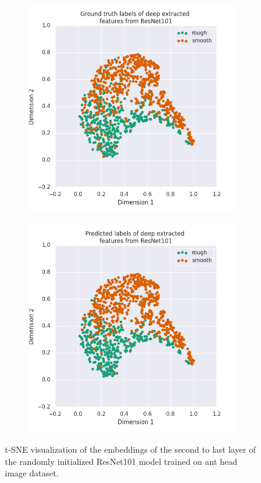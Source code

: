 \documentclass[12pt]{article}
\begin{document}
\begin{figure}[h]
    \centering
    \begin{subfigure}{.45\textwidth}
        \includegraphics[width=1\linewidth]{assets/plots/resnet101_gt_tsne.png}
    \end{subfigure}
    \begin{subfigure}{.45\textwidth}
        \includegraphics[width=1\linewidth]{assets/plots/resnet101_pred_tsne.png}
    \end{subfigure}
    \caption{t-SNE visualization of the embeddings of the second to last layer
        of the randomly initialized ResNet101 model trained on ant head image
        dataset.}
    \label{fig:resnet101_tsne}
\end{figure}
\end{document}
